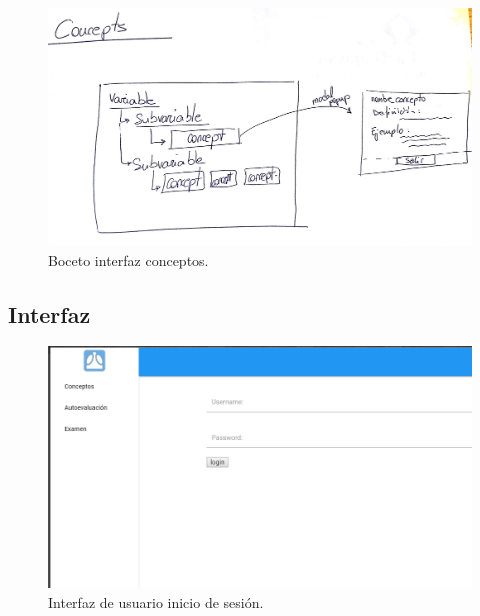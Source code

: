 \begin{figure}[!ht]
  \begin{center}
    \includegraphics[width=1\textwidth]{../images/boceto_conceptos.png}
    \caption{Boceto interfaz conceptos.}
    \label{fig:boceto_conceptos}
  \end{center}
\end{figure}


\newpage

\subsection{Interfaz}

\begin{figure}[!ht]
  \begin{center}
    \includegraphics[width=1\textwidth]{../images/interfaz_login.png}
    \caption{Interfaz de usuario inicio de sesión.}
    \label{fig:interfaz_login}
  \end{center}
\end{figure}


